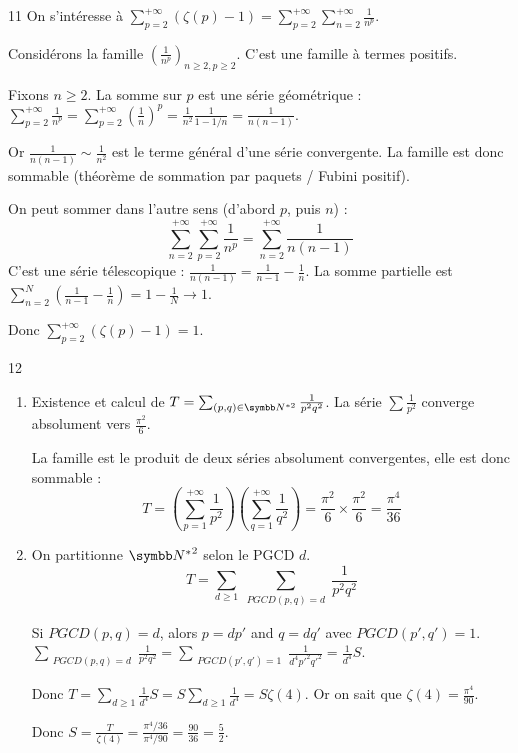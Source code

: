 \begin{correction}{11}
    On s'intéresse à $\displaystyle \sum_{p=2}^{+\infty} (\zeta(p)-1) = \sum_{p=2}^{+\infty} \sum_{n=2}^{+\infty} \frac{1}{n^p}$.

    Considérons la famille $(\frac{1}{n^p})_{n\geqslant2, p\geqslant2}$.
    C'est une famille à termes positifs.

    Fixons $n \geqslant 2$. La somme sur $p$ est une série géométrique :
    $\displaystyle \sum_{p=2}^{+\infty} \frac{1}{n^p} = \sum_{p=2}^{+\infty} \left(\frac{1}{n}\right)^p = \frac{1}{n^2} \frac{1}{1-1/n} = \frac{1}{n(n-1)}$.

    Or $\frac{1}{n(n-1)} \sim \frac{1}{n^2}$ est le terme général d'une série convergente.
    La famille est donc sommable (théorème de sommation par paquets / Fubini positif).

    On peut sommer dans l'autre sens (d'abord $p$, puis $n$) :
    $$ \sum_{n=2}^{+\infty} \sum_{p=2}^{+\infty} \frac{1}{n^p} = \sum_{n=2}^{+\infty} \frac{1}{n(n-1)} $$
    C'est une série télescopique : $\frac{1}{n(n-1)} = \frac{1}{n-1} - \frac{1}{n}$.
    La somme partielle est $\sum_{n=2}^N \left(\frac{1}{n-1} - \frac{1}{n}\right) = 1 - \frac{1}{N} \to 1$.

    Donc $\displaystyle \sum_{p=2}^{+\infty} (\zeta(p)-1) = 1$.
\end{correction}

\begin{correction}{12}
\begin{enumerate}
    \item Existence et calcul de $T = \sum_{(p,q)\in\N^{*2}}\frac{1}{p^{2}q^{2}}$.
        La série $\sum \frac{1}{p^2}$ converge absolument vers $\frac{\pi^2}{6}$.

        La famille est le produit de deux séries absolument convergentes, elle est donc sommable :
        $$T = \left(\sum_{p=1}^{+\infty} \frac{1}{p^2}\right) \left(\sum_{q=1}^{+\infty} \frac{1}{q^2}\right) = \frac{\pi^2}{6} \times \frac{\pi^2}{6} = \frac{\pi^4}{36}$$

    \item On partitionne ${\N^{*}}^2$ selon le PGCD $d$.
        $$T = \sum_{d \geqslant 1} \sum_{\substack{PGCD(p,q)=d}} \frac{1}{p^2 q^2}$$
        
        Si $PGCD(p,q)=d$, alors $p=dp'$ and $q=dq'$ avec $PGCD(p',q')=1$.
        $\sum_{\substack{PGCD(p,q)=d}} \frac{1}{p^2 q^2} = \sum_{\substack{PGCD(p',q')=1}} \frac{1}{d^4 p'^2 q'^2} = \frac{1}{d^4} S$.

        Donc $T = \sum_{d \geqslant 1} \frac{1}{d^4} S = S \sum_{d \geqslant 1} \frac{1}{d^4} = S \zeta(4)$.
        Or on sait que $\zeta(4) = \frac{\pi^4}{90}$.

        Donc $S = \frac{T}{\zeta(4)} = \frac{\pi^4/36}{\pi^4/90} = \frac{90}{36} = \frac{5}{2}$.
\end{enumerate}
\end{correction}

